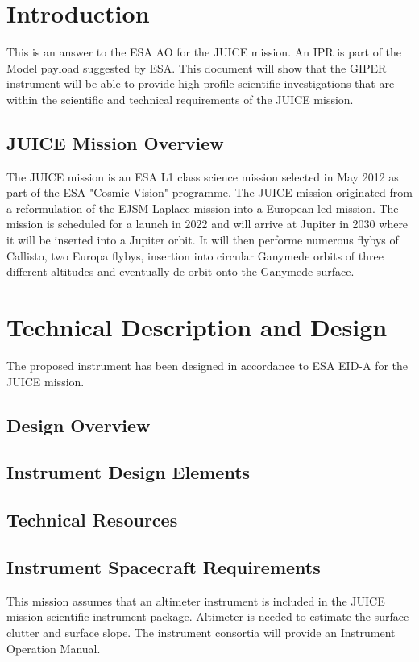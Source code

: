 \section{Introduction}
\label{sec:introduction}
%
This is an answer to the \ac{ESA} \ac{AO}\cite{JUICE_AO} for the \ac{JUICE} mission. An \ac{IPR} is part of the Model payload suggested by \ac{ESA}\cite{yellowbook}. This document will show that the \ac{GIPER} instrument will be able to provide high profile scientific investigations that are within the scientific and technical requirements of the \ac{JUICE} mission.
%
\subsection{JUICE Mission Overview}
The \ac{JUICE} mission is an \ac{ESA} L1 class science mission selected in May 2012 as part of the \ac{ESA} "Cosmic Vision" programme. The \ac{JUICE} mission originated from a reformulation of the EJSM-Laplace mission into a European-led mission. The mission is scheduled for a launch in 2022 and will arrive at Jupiter in 2030 where it will be inserted into a Jupiter orbit. It will then performe numerous flybys of Callisto, two Europa flybys, insertion into circular Ganymede orbits of three different altitudes and eventually de-orbit onto the Ganymede surface. 
%
%
%

%
\section{Technical Description and Design}
%
The proposed instrument has been designed in accordance to ESA \ac{EID-A} for the \ac{JUICE} mission\cite{EIDA}.
%
%

%
%
\subsection{Design Overview}
\subsection{Instrument Design Elements}
\subsection{Technical Resources}
\subsection{Instrument Spacecraft Requirements}
This mission assumes that an altimeter instrument is included in the JUICE mission scientific instrument package. Altimeter is needed to estimate the surface clutter and surface slope.
%
The instrument consortia will provide an Instrument Operation Manual.
%

